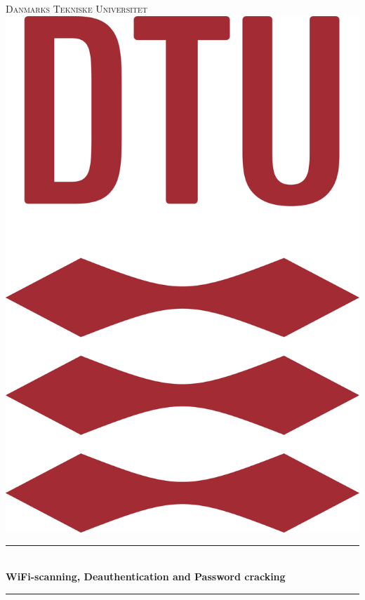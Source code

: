 \begin{titlepage}

\newcommand{\HRule}{\rule{\linewidth}{0.5mm}}

\center

\textsc{\Large Danmarks Tekniske Universitet}\\[1.5cm]

\includegraphics[scale=0.15]{Billeder/DTULogo.png}\\[1.3cm]

\HRule\\[0.5cm]

{\huge\bfseries WiFi-scanning, Deauthentication and Password cracking}\\[0.4cm]

\HRule\\[1.3cm]


\end{titlepage}
